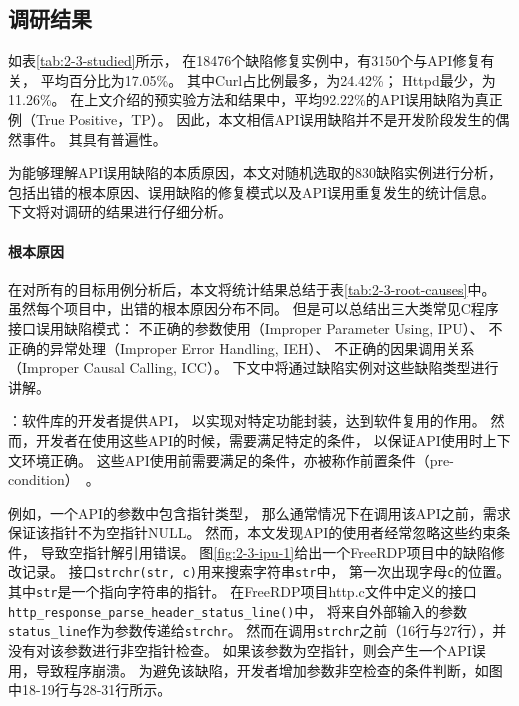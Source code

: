 \subsection{调研结果}
如表\ref{tab:2-3-studied}所示，
在18476个缺陷修复实例中，有3150个与API修复有关，
平均百分比为17.05\%。
其中Curl占比例最多，为24.42\%；
Httpd最少，为11.26\%。
在上文介绍的预实验方法和结果中，平均92.22\%的API误用缺陷为真正例（True Positive，TP）。
因此，本文相信API误用缺陷并不是开发阶段发生的偶然事件。
其具有普遍性。

\vspace*{10pt}
\begin{center}
\noindent{}
\end{center}

为能够理解API误用缺陷的本质原因，本文对随机选取的830缺陷实例进行分析，
包括出错的根本原因、误用缺陷的修复模式以及API误用重复发生的统计信息。
下文将对调研的结果进行仔细分析。


\paragraph{根本原因}

在对所有的目标用例分析后，本文将统计结果总结于表\ref{tab:2-3-root-causes}中。
虽然每个项目中，出错的根本原因分布不同。
但是可以总结出三大类常见C程序接口误用缺陷模式：
不正确的参数使用（Improper Parameter Using, IPU）、
不正确的异常处理（Improper Error Handling, IEH）、
不正确的因果调用关系（Improper Causal Calling, ICC）。
下文中将通过缺陷实例对这些缺陷类型进行讲解。



：软件库的开发者提供API，
以实现对特定功能封装，达到软件复用的作用。
然而，开发者在使用这些API的时候，需要满足特定的条件，
以保证API使用时上下文环境正确。
这些API使用前需要满足的条件，亦被称作前置条件（pre-condition）~\cite{14-fse-pre}。

例如，一个API的参数中包含指针类型，
那么通常情况下在调用该API之前，需求保证该指针不为空指针NULL。
然而，本文发现API的使用者经常忽略这些约束条件，
导致空指针解引用错误。
图\ref{fig:2-3-ipu-1}给出一个FreeRDP项目中的缺陷修改记录。
接口\texttt{strchr(str, c)}用来搜索字符串\texttt{str}中，
第一次出现字母\texttt{c}的位置。
其中\texttt{str}是一个指向字符串的指针。
在FreeRDP项目http.c文件中定义的接口\texttt{http\_response\_parse\_header\_status\_line()}中，
将来自外部输入的参数\texttt{status\_line}作为参数传递给\texttt{strchr}。
然而在调用\texttt{strchr}之前（16行与27行），并没有对该参数进行非空指针检查。
如果该参数为空指针，则会产生一个API误用，导致程序崩溃。
为避免该缺陷，开发者增加参数非空检查的条件判断，如图中18-19行与28-31行所示。


